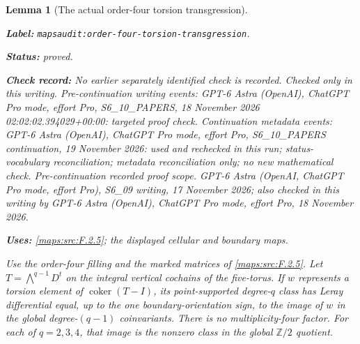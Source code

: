 \documentclass[11pt,a4paper]{article}
\newtheorem{lemma}[lemma]{Lemma}
\theoremstyle{definition}
\newcommand{\StatementRecord}[4]{\par\smallskip\begingroup\upshape\raggedright\noindent\textbf{Label:} \nolinkurl{#1}.\par\noindent\textbf{Status:} #2.\par\noindent\textbf{Check record:} #3.\par\noindent\textbf{Uses:} #4.\par\endgroup\smallskip}
\begin{document}
\begin{lemma}[The actual order-four torsion transgression]
\label{mapsaudit:order-four-torsion-transgression}
\StatementRecord{mapsaudit:order-four-torsion-transgression}{proved}{No earlier separately identified check is recorded. Checked only in this writing. Pre-continuation writing events: GPT-6 Astra (OpenAI), ChatGPT Pro mode, effort Pro, S6\_10\_PAPERS, 18 November 2026 02:02:02.394029+00:00: targeted proof check. Continuation metadata events: GPT-6 Astra (OpenAI), ChatGPT Pro mode, effort Pro, S6\_10\_PAPERS continuation, 19 November 2026: used and rechecked in this run; status-vocabulary reconciliation; metadata reconciliation only; no new mathematical check. \emph{Pre-continuation recorded proof scope.} GPT-6 Astra (OpenAI, ChatGPT Pro mode, effort Pro), S6\_09 writing, 17 November 2026; also checked in this writing by GPT-6 Astra (OpenAI), ChatGPT Pro mode, effort Pro, 18 November 2026}{\cref{maps:src:F.2.5}; the displayed cellular and boundary maps}

Use the order-four filling and the marked matrices of \cref{maps:src:F.2.5}.
Let $T=\bigwedge^{q-1}D^t$ on the integral vertical cochains of the
five-torus. If $w$ represents a torsion element of
$\operatorname{coker}(T-I)$, its point-supported degree-$q$ class has
Leray differential equal, up to the one boundary-orientation sign, to
the image of $w$ in the global degree-$(q-1)$ coinvariants. There is
no multiplicity-four factor. For each of $q=2,3,4$, that image is
the nonzero class in the global $\mathbb Z/2$ quotient.
\end{lemma}
\end{document}

